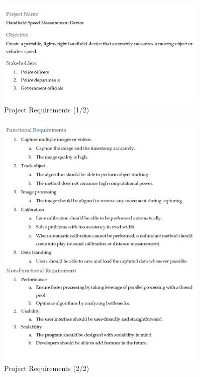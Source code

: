 \begin{figure}[!ht]
    \centering
    \includegraphics[width=0.9\textwidth]{texs/Part2/chapter2/image/req1.jpg}
    \caption{Project Requirements (1/2)}
    \label{fig:project-requirements-1}
\end{figure}

\begin{figure}[!ht]
    \centering
    \includegraphics[width=0.9\textwidth]{texs/Part2/chapter2/image/req2.jpg}
    \caption{Project Requirements (2/2)}
    \label{fig:project-requirements-2}
\end{figure}











